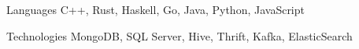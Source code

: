 


\begin{cvskills}


  \cvskill
  {Languages} %
  {C++, Rust, Haskell, Go, Java, Python, JavaScript} %

  \cvskill
  {Technologies}
  {MongoDB, SQL Server, Hive, Thrift, Kafka, ElasticSearch} %
  
\end{cvskills}
